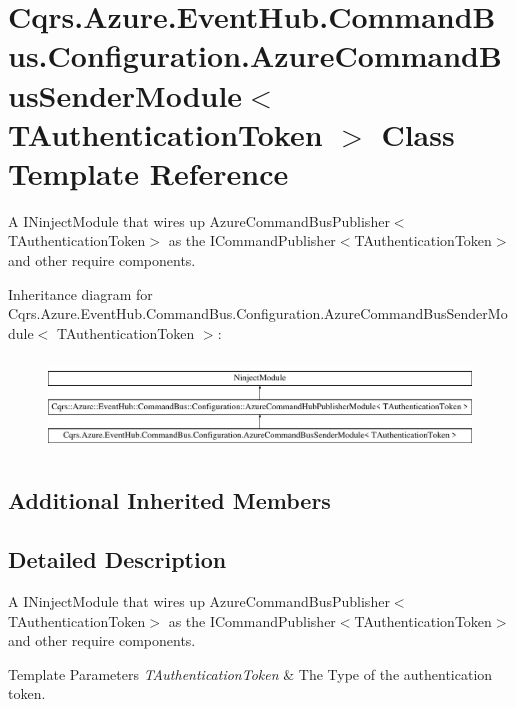 \hypertarget{classCqrs_1_1Azure_1_1EventHub_1_1CommandBus_1_1Configuration_1_1AzureCommandBusSenderModule}{}\section{Cqrs.\+Azure.\+Event\+Hub.\+Command\+Bus.\+Configuration.\+Azure\+Command\+Bus\+Sender\+Module$<$ T\+Authentication\+Token $>$ Class Template Reference}
\label{classCqrs_1_1Azure_1_1EventHub_1_1CommandBus_1_1Configuration_1_1AzureCommandBusSenderModule}


A I\+Ninject\+Module that wires up Azure\+Command\+Bus\+Publisher$<$\+T\+Authentication\+Token$>$ as the I\+Command\+Publisher$<$\+T\+Authentication\+Token$>$ and other require components.  


Inheritance diagram for Cqrs.\+Azure.\+Event\+Hub.\+Command\+Bus.\+Configuration.\+Azure\+Command\+Bus\+Sender\+Module$<$ T\+Authentication\+Token $>$\+:\begin{figure}[H]
\begin{center}
\leavevmode
\includegraphics[height=2.511211cm]{classCqrs_1_1Azure_1_1EventHub_1_1CommandBus_1_1Configuration_1_1AzureCommandBusSenderModule}
\end{center}
\end{figure}
\subsection*{Additional Inherited Members}


\subsection{Detailed Description}
A I\+Ninject\+Module that wires up Azure\+Command\+Bus\+Publisher$<$\+T\+Authentication\+Token$>$ as the I\+Command\+Publisher$<$\+T\+Authentication\+Token$>$ and other require components. 


\begin{DoxyTemplParams}{Template Parameters}
{\em T\+Authentication\+Token} & The Type of the authentication token.\\
\hline
\end{DoxyTemplParams}
